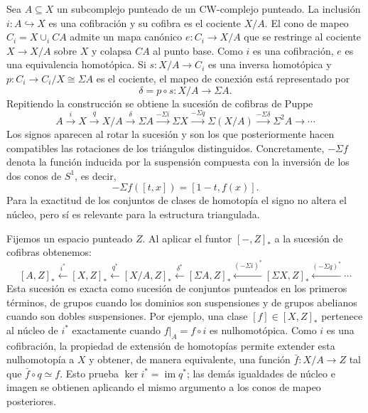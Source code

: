 Sea $A\subseteq X$ un subcomplejo punteado de un CW-complejo punteado. La inclusión $i\colon A\hookrightarrow X$ es una cofibración y su cofibra es el cociente $X/A$. El cono de mapeo
\(
C_i=X\cup_iCA
\)
admite un mapa canónico
\(
e\colon C_i\longrightarrow X/A
\)
que se restringe al cociente $X\to X/A$ sobre $X$ y colapsa $CA$ al punto base. Como $i$ es una cofibración, $e$ es una equivalencia homotópica. Si $s\colon X/A\to C_i$ es una inversa homotópica y
\(
p\colon C_i\longrightarrow C_i/X\cong\Sigma A
\)
es el cociente, el mapeo de conexión está representado por
\[
\delta=p\circ s\colon X/A\longrightarrow\Sigma A.
\]
Repitiendo la construcción se obtiene la sucesión de cofibras de Puppe
\[
A\xrightarrow{i}X\xrightarrow{q}X/A\xrightarrow{\delta}\Sigma A\xrightarrow{-\Sigma i}\Sigma X\xrightarrow{-\Sigma q}\Sigma(X/A)\xrightarrow{-\Sigma\delta}\Sigma^2A\longrightarrow\cdots
\]
Los signos aparecen al rotar la sucesión y son los que posteriormente hacen compatibles las rotaciones de los triángulos distinguidos. Concretamente, $-\Sigma f$ denota la función inducida por la suspensión compuesta con la inversión de los dos conos de $S^1$, es decir,
\[
-\Sigma f([t,x])=[1-t,f(x)].
\]
Para la exactitud de los conjuntos de clases de homotopía el signo no altera el núcleo, pero sí es relevante para la estructura triangulada.



Fijemos un espacio punteado $Z$. Al aplicar el funtor $[-,Z]_*$ a la sucesión de cofibras obtenemos:
\[
[A,Z]_*\xleftarrow{i^*}[X,Z]_*\xleftarrow{q^*}[X/A,Z]_*\xleftarrow{\delta^*}[\Sigma A,Z]_*\xleftarrow{(-\Sigma i)^*}[\Sigma X,Z]_*\xleftarrow{(-\Sigma q)^*}\cdots
\]
Esta sucesión es exacta como sucesión de conjuntos punteados en los primeros términos, de grupos cuando los dominios son suspensiones y de grupos abelianos cuando son dobles suspensiones. Por ejemplo, una clase $[f]\in[X,Z]_*$ pertenece al núcleo de $i^*$ exactamente cuando $f|_A=f\circ i$ es nulhomotópica. Como $i$ es una cofibración, la propiedad de extensión de homotopías permite extender esta nulhomotopía a $X$ y obtener, de manera equivalente, una función $\bar f\colon X/A\to Z$ tal que $\bar f\circ q\simeq f$. Esto prueba $\ker i^*=\operatorname{im}q^*$; las demás igualdades de núcleo e imagen se obtienen aplicando el mismo argumento a los conos de mapeo posteriores.

